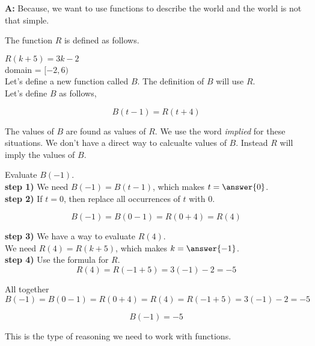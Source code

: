\documentclass{ximera}
\begin{document}
\textbf{A:} Because, we want to use functions to describe the world and the world is not that simple. \\




\begin{example}


The function $R$ is defined as follows.

$R(k + 5) = 3k - 2$ \\
domain = $[-2, 6)$ \\


Let's define a new function called $B$.  The definition of $B$ will use $R$. \\



Let's define $B$ as follows,

\[ 
B(t - 1) = R(t + 4)
\]

The values of $B$ are found as values of $R$.  We use the word \textit{implied} for these situations.  We don't have a direct way to calcualte values of $B$.  Instead $R$ will imply the values of $B$. \\


\begin{question}

Evaluate $B(-1)$. \\


\textbf{step 1)}  We need $B(-1) = B(t - 1)$, which makes $t = \answer{0}$. \\


\textbf{step 2)}  If $t = 0$, then replace all occurrences of $t$ with $0$. 

\[
B(-1) = B(0 - 1) = R(0 + 4) = R(4)
\]


\textbf{step 3)} We have a way to evaluate $R(4)$.\\


We need $R(4) = R(k + 5)$, which makes $k = \answer{-1}$. \\


\textbf{step 4)} Use the formula for $R$.\\

\[
R(4) = R(-1 + 5) = 3(-1) - 2 = -5
\]


All together \\



\[
B(-1) = B(0 - 1) = R(0 + 4) = R(4) = R(-1 + 5) = 3(-1) - 2 = -5
\]


\[
B(-1) = -5
\]

\end{question}


This is the type of reasoning we need to work with functions. \\












\end{example}
\end{document}
